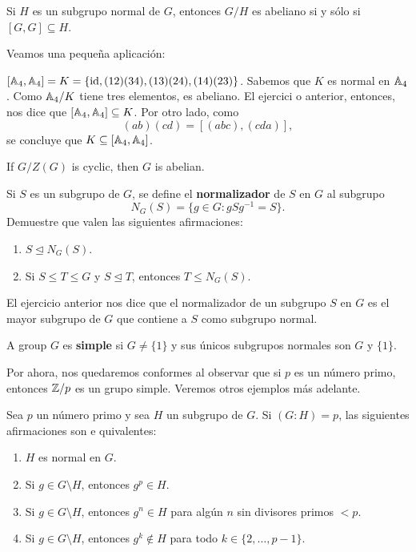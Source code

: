 \begin{exercise}
\label{xca:commutator}
Si $H$ es un subgrupo normal de $G$, entonces $G/H$ es abeliano si y sólo si $[G,G]\subseteq H$.
\end{exercise}



Veamos una pequeña aplicación:

\begin{example}
$[\mathbb{A}_4,\mathbb{A}_4]=K=\{\operatorname{id},(12)(34),(13)(24),(14)(23)\}$.
Sabemos que $K$ es normal en $\mathbb{A}_4$. Como $\mathbb{A}_4/K$ tiene tres elementos, es abeliano. El ejercici
o anterior, entonces,
nos dice que $[\mathbb{A}_4,\mathbb{A}_4]\subseteq K$. Por otro lado, como
\[
(ab)(cd)=[(abc),(cda)],
\]
se concluye que $K\subseteq[\mathbb{A}_4,\mathbb{A}_4]$.
\end{example}

\begin{exercise}
\label{xca:G/Z(G)}
If $G/Z(G)$ is cyclic, then $G$ is abelian.
\end{exercise}


\begin{exercise}
Si $S$ es un subgrupo de $G$, se define el \textbf{normalizador} de $S$ en $G$ al subgrupo
\[
N_G(S)=\{g\in G:gSg^{-1}=S\}.
\]
Demuestre que valen las siguientes afirmaciones:
\begin{enumerate}
\item $S\unlhd N_G(S)$.
\item Si $S\leq T\leq G$ y $S\unlhd T$, entonces $T\leq N_G(S)$.
\end{enumerate}
\end{exercise}

El ejercicio anterior nos dice que el normalizador de un subgrupo $S$ en $G$ es el mayor subgrupo de
$G$ que contiene a $S$ como subgrupo normal.

\begin{definition}
A group $G$ es \textbf{simple} si $G\ne\{1\}$ y sus únicos subgrupos normales
son $G$ y $\{1\}$.
\end{definition}

Por ahora, nos quedaremos conformes al observar que si $p$ es un número primo, entonces $\mathbb{Z}/p$ es un
grupo simple. Veremos otros ejemplos más adelante.

\begin{exercise}
Sea $p$ un número primo y sea $H$ un subgrupo de $G$. Si $(G:H)=p$, las siguientes afirmaciones son e
quivalentes:
\begin{enumerate}
\item $H$ es normal en $G$.
\item Si $g\in G\setminus H$, entonces $g^p\in H$.
\item Si $g\in G\setminus H$, entonces $g^n\in H$ para algún $n$ sin divisores primos $<p$.
\item Si $g\in G\setminus H$, entonces $g^k\not\in H$ para todo $k\in\{2,\dots,p-1\}$.
\end{enumerate}
\end{exercise}

